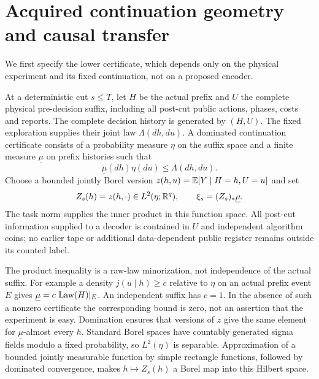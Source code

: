 \section{Acquired continuation geometry and causal transfer}\label{sec:transfer}
We first specify the lower certificate, which depends only on the physical experiment and its fixed continuation, not on a proposed encoder.

\begin{definition}\label{def:cut}
At a deterministic cut $s\le T$, let $H$ be the actual prefix and $U$ the complete physical pre-decision suffix, including all post-cut public actions, phases, costs and reports. The complete decision history is generated by $(H,U)$. The fixed exploration supplies their joint law $\Lambda(dh,du)$. A dominated continuation certificate consists of a probability measure $\eta$ on the suffix space and a finite measure $\underline\mu$ on prefix histories such that
\begin{equation}\label{eq:domination}
 \underline\mu(dh)\eta(du)\le\Lambda(dh,du).
\end{equation}
Choose a bounded jointly Borel version $z(h,u)=\mathbb E[Y\mid H=h,U=u]$ and set
\[
 Z_s(h)=z(h,\cdot)\in L^2(\eta;\mathbb R^q),\qquad
 \xi_s=(Z_s)_*\underline\mu.
\]
The task norm supplies the inner product in this function space. All post-cut information supplied to a decoder is contained in $U$ and independent algorithm coins; no earlier tape or additional data-dependent public register remains outside its counted label.
\end{definition}

The product inequality is a raw-law minorization, not independence of the actual suffix. For example a density $j(u\mid h)\ge c$ relative to $\eta$ on an actual prefix event $E$ gives $\underline\mu=c\,\operatorname{Law}(H)|_E$. An independent suffix has $c=1$. In the absence of such a nonzero certificate the corresponding bound is zero, not an assertion that the experiment is easy. Domination ensures that versions of $z$ give the same element for $\underline\mu$-almost every $h$. Standard Borel spaces have countably generated sigma fields modulo a fixed probability, so $L^2(\eta)$ is separable. Approximation of a bounded jointly measurable function by simple rectangle functions, followed by dominated convergence, makes $h\mapsto Z_s(h)$ a Borel map into this Hilbert space.

